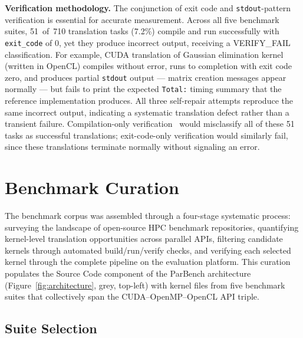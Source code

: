 \documentclass[conference]{IEEEtran}
\newcommand{\verifyfail}{\textsc{VERIFY\_FAIL}}
\begin{document}
\textbf{Verification methodology.} The conjunction of exit code and \texttt{stdout}-pattern verification is essential for accurate measurement. Across all five benchmark suites, 51~of~710 translation tasks (7.2\%) compile and run successfully with \texttt{exit\_code} of 0, yet they produce incorrect output, receiving a \verifyfail{} classification. For example, CUDA translation of Gaussian elimination kernel (written in OpenCL) compiles without error, runs to completion with exit code zero, and produces partial \texttt{stdout} output --- matrix creation messages appear normally --- but fails to print the expected \texttt{Total:} timing summary that the reference implementation produces. All three self-repair attempts reproduce the same incorrect output, indicating a systematic translation defect rather than a transient failure. Compilation-only verification~\cite{CodeRosetta2024} would misclassify all of these 51 tasks as successful translations; exit-code-only verification would similarly fail, since these translations terminate normally without signaling an error.

\section{Benchmark Curation}
\label{sec:benchmark-curation}

The benchmark corpus was assembled through a four-stage systematic process: surveying the landscape of open-source HPC benchmark repositories, quantifying kernel-level translation opportunities across parallel APIs, filtering candidate kernels through automated build/run/verify checks, and verifying each selected kernel through the complete pipeline on the evaluation platform. This curation populates the Source Code component of the ParBench architecture (Figure~\ref{fig:architecture}, grey, top-left) with kernel files from five benchmark suites that collectively span the CUDA--OpenMP--OpenCL API triple.

\subsection{Suite Selection}
\label{sec:suite-selection}
\end{document}
